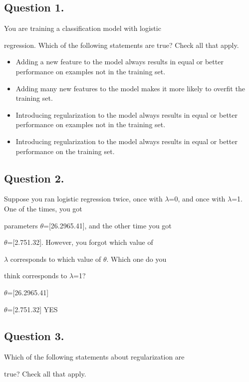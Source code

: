 \documentclass[11pt]{article} %
\begin{document}
	\subsection{Question 1. } 
	You are training a classification model with logistic
	
	regression. Which of the following statements are true? Check 
	all that apply.
	
	\begin{itemize}
		\item 
		Adding a new feature to the model always results in equal or better performance on examples not in the training set.
		\item 
		Adding many new features to the model makes it more likely to overfit the training set.
		\item 
		Introducing regularization to the model always results in equal or better performance on examples not in the training set.
		\item 
		Introducing regularization to the model always results in equal or better performance on the training set.
	\end{itemize}
	\subsection{Question 2. } 
	Suppose you ran logistic regression twice, once with $\lambda$=0, and once with $\lambda$=1. One of the times, you got
	
	parameters $\theta$=[26.2965.41], and the other time you got
	
	$\theta$=[2.751.32]. However, you forgot which value of
	
	$\lambda$ corresponds to which value of $\theta$. Which one do you
	
	think corresponds to $\lambda$=1?
	
	$\theta$=[26.2965.41]
	
	$\theta$=[2.751.32]  YES
	\subsection{Question 3. } 
	Which of the following statements about regularization are
	
	true? Check all that apply.
	
\end{document}
